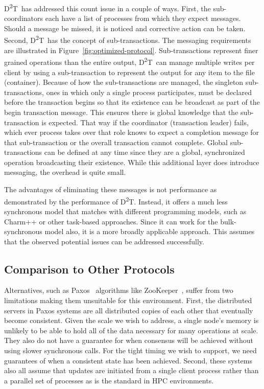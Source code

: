 \documentclass[conference]{sig-alt-gov2}
\newcommand{\DDT}{D\textsuperscript{2}T~}
\newcommand{\DDTns}{D\textsuperscript{2}T}
\begin{document}
\DDT has addressed this count issue in a couple of ways. First, the
sub-coordinators each have a list of processes from which they expect messages.
Should a message be missed, it is noticed and corrective action can be taken.
Second, \DDT has the concept of sub-transactions. The messaging requirements
are illustrated in Figure~\ref{fig:optimized-protocol}.  Sub-transactions
represent finer grained operations than the entire output, \DDT can manage
multiple writes per client by using a sub-transaction to represent the output
for any item to the file (container). Because of how the sub-transactions are
managed, the singleton sub-transactions, ones in which only a single process
participates, must be declared before the transaction begins so that its
existence can be broadcast as part of the begin transaction message. This
ensures there is global knowledge that the sub-transaction is expected.  That
way if the coordinator (transaction leader) fails, which ever process takes
over that role knows to expect a completion message for that sub-transaction or
the overall transaction cannot complete. Global sub-transactions can be defined
at any time since they are a global, synchronized operation broadcasting their
existence. While this additional layer does introduce messaging, the overhead
is quite small.

The advantages of eliminating these messages is not performance as demonstrated
by the performance of \DDTns. Instead, it offers a much less synchronous model
that matches with different programming models, such as Charm++ or other
task-based approaches. Since it can work for the bulk-synchronous model also,
it is a more broadly applicable approach. This assumes that the observed
potential issues can be addressed successfully.

\subsection{Comparison to Other Protocols}
Alternatives, such as Paxos~\cite{Lamport:1998:paxos} algorithms like
ZooKeeper~\cite{Hunt:2010:zookeeper}, suffer from two limitations making them
unsuitable for this environment. First, the distributed servers in Paxos
systems are all distributed copies of each other that eventually become
consistent. Given the scale we wish to address, a single node's memory is
unlikely to be able to hold all of the data necessary for many operations at
scale. They also do not have a guarantee for when consensus will be achieved
without using slower synchronous calls. For the tight timing we wish to
support, we need guarantees of when a consistent state has been achieved.
Second, these systems also all assume that updates are initiated from a single
client process rather than a parallel set of processes as is the standard in
HPC environments.
\end{document}
